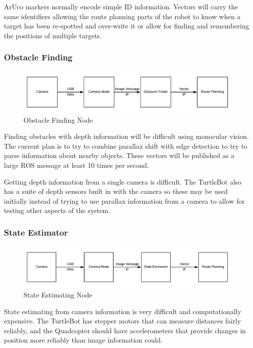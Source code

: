 \documentclass{article}
\begin{document}
	ArUco markers normally encode simple ID information. Vectors will carry the same identifiers allowing the route planning parts of the robot to know when a target has been re-spotted and over-write it or allow for finding and remembering the positions of multiple targets. 
	
	\subsubsection{Obstacle Finding}
	
	\begin{figure}[H]
		\centering
		\includegraphics[width=0.9\linewidth]{Camera-Obstacle}
		\caption{Obstacle Finding Node}
		\label{fig:obstacle}
	\end{figure}

	Finding obstacles with depth information will be difficult using monocular vision. The current plan is to try to combine parallax shift with edge detection to try to parse information about nearby objects. These vectors will be published as a large ROS message at least 10 times per second. 
	
	Getting depth information from a single camera is difficult. The TurtleBot also has a suite of depth sensors built in with the camera so these may be used initially instead of trying to use parallax information from a camera to allow for testing other aspects of the system.
	
	\subsubsection{State Estimator}
	
	\begin{figure}[H]
		\centering
		\includegraphics[width=0.9\linewidth]{Camera-State-Route}
		\caption{State Estimating Node}
		\label{fig:state}
	\end{figure}

	State estimating from camera information is very difficult and computationally expensive. The TurtleBot has stepper motors that can measure distances fairly reliably, and the Quadcopter should have accelerometers that provide changes in position more reliably than image information could. 
	
\end{document}
